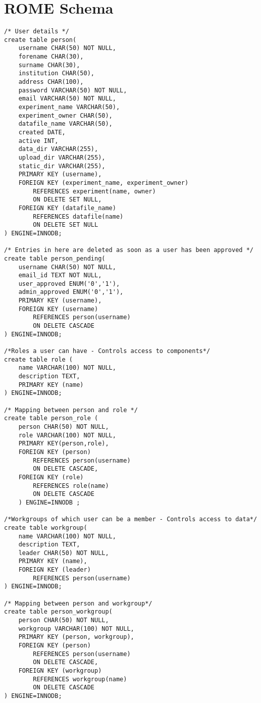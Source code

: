 \chapter{ROME Schema}
\label{ch:rome_schema}


\begin{tiny}
\begin{verbatim}
/* User details */
create table person(
	username CHAR(50) NOT NULL,
	forename CHAR(30),
	surname CHAR(30),
	institution CHAR(50),
	address CHAR(100),
	password VARCHAR(50) NOT NULL,
	email VARCHAR(50) NOT NULL,
	experiment_name VARCHAR(50),
	experiment_owner CHAR(50),
	datafile_name VARCHAR(50),
	created DATE,
	active INT,
	data_dir VARCHAR(255),
	upload_dir VARCHAR(255),
	static_dir VARCHAR(255),
	PRIMARY KEY (username),
	FOREIGN KEY (experiment_name, experiment_owner)
		REFERENCES experiment(name, owner)
		ON DELETE SET NULL,
	FOREIGN KEY (datafile_name)
		REFERENCES datafile(name)
		ON DELETE SET NULL
) ENGINE=INNODB;

/* Entries in here are deleted as soon as a user has been approved */ 	
create table person_pending(
	username CHAR(50) NOT NULL,
	email_id TEXT NOT NULL,
	user_approved ENUM('0','1'),
	admin_approved ENUM('0','1'),
	PRIMARY KEY (username),
	FOREIGN KEY (username) 
		REFERENCES person(username)
		ON DELETE CASCADE
) ENGINE=INNODB;

/*Roles a user can have - Controls access to components*/
create table role (
	name VARCHAR(100) NOT NULL,
	description TEXT,
	PRIMARY KEY (name)
) ENGINE=INNODB; 	

/* Mapping between person and role */
create table person_role (
	person CHAR(50) NOT NULL,
	role VARCHAR(100) NOT NULL,
	PRIMARY KEY(person,role),
	FOREIGN KEY (person) 
		REFERENCES person(username) 
		ON DELETE CASCADE,
	FOREIGN KEY (role) 
		REFERENCES role(name) 
		ON DELETE CASCADE
 	) ENGINE=INNODB ;

/*Workgroups of which user can be a member - Controls access to data*/
create table workgroup(
	name VARCHAR(100) NOT NULL,
	description TEXT,
	leader CHAR(50) NOT NULL,
	PRIMARY KEY (name),
	FOREIGN KEY (leader) 
		REFERENCES person(username)
) ENGINE=INNODB;

/* Mapping between person and workgroup*/
create table person_workgroup(
	person CHAR(50) NOT NULL,
	workgroup VARCHAR(100) NOT NULL,
	PRIMARY KEY (person, workgroup),
	FOREIGN KEY (person) 
		REFERENCES person(username) 
		ON DELETE CASCADE,
	FOREIGN KEY (workgroup) 
		REFERENCES workgroup(name) 
		ON DELETE CASCADE
) ENGINE=INNODB;


\end{verbatim}
\end{tiny}
